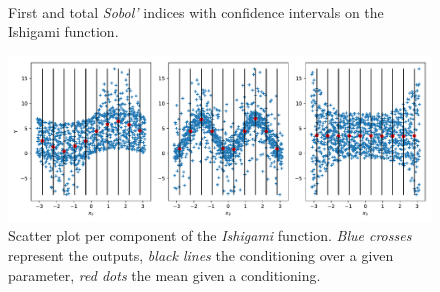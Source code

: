 \begin{figure}[!ht]               
\centering
{}
~
\caption{First and total \textit{Sobol'} indices with confidence intervals on the Ishigami function.}
\label{fig:sobol}
\end{figure}


\begin{figure}[!ht]
\centering
\includegraphics[width=\linewidth,keepaspectratio]{fig/literature/scatter_sobol.pdf}
\caption{Scatter plot per component of the \textit{Ishigami} function. \emph{Blue crosses} represent the outputs, \emph{black lines} the conditioning over a given parameter, \emph{red dots} the mean given a conditioning.}
\label{fig:scatter_sobol}
\end{figure}

